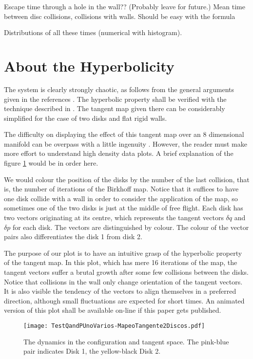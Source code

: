 \documentclass[a4paper,10pt]{article}
\begin{document}
Escape time through a hole in the wall?? (Probably leave for future.)
Mean time between disc collisions, collisions with walls. Should be easy with the formula

Distributions of all these times (numerical with histogram).



\section{About the Hyperbolicity}

The system is clearly strongly chaotic, as follows from
the general arguments given in the references \cite{Sim99, MarkChern}.
The hyperbolic property shall be verified with the technique described
in \cite{Dellago96}. The tangent map given there can be considerably
simplified for the case of two disks and flat rigid walls.

The difficulty on displaying the effect of this tangent map over
an 8 dimensional manifold
can be overpass with a little ingenuity \cite{Tufte}. However,
the reader must make more effort to understand high density data
plots. A brief explanation of the figure \ref{TangentMap} would
be in order here. 

We would colour the position of the disks by the number of
the last collision, that is, the number of iterations of
the Birkhoff map. Notice that it suffices to have one disk collide
with a wall in order to consider the application of the map, so
sometimes one of the two disks is just at the middle of
free flight. Each disk has two vectors originating at its centre,
which represents the tangent vectors $\delta q$ and 
$\delta p$ for each disk. 
The vectors are distinguished by colour. The colour of the vector pairs
also differentiates the disk 1 from disk 2. 

The purpose of our plot is to have an intuitive grasp of the
hyperbolic property of the tangent map. In this plot, which has mere 16
iterations of the map, the tangent vectors suffer a brutal growth after
some few collisions between the disks. Notice that collisions in
the wall only change orientation of the tangent vectors.
It is also visible the tendency of the vectors to align themselves
in a preferred direction, although small fluctuations are
expected for short times. An animated version of this plot 
shall be available on-line if this paper gets published. 

\begin{figure}
\centering
\texttt{[image: TestQandPUnoVarios-MapeoTangente2Discos.pdf]} 
\caption{The dynamics in the configuration and tangent space. The pink-blue pair
indicates Disk 1, the yellow-black Disk 2.}\label{TangentMap}
\end{figure}




\end{document}
